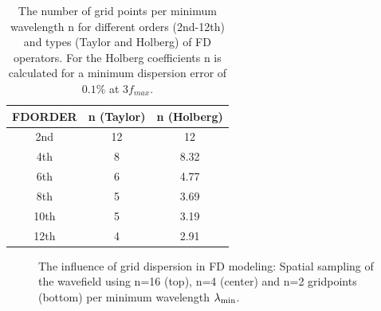 \documentclass[11pt,onecolumn,oneside]{article}
\begin{document}
\begin{table}[hbt]
\begin{center}
\begin{tabular}{ccc}\hline \hline
FDORDER & n (Taylor) & n (Holberg) \\ \hline 
2nd   &   12       &  12         \\
4th   &   8        &  8.32       \\
6th   &   6        &  4.77       \\
8th   &   5        &  3.69       \\ 
10th  &   5        &  3.19       \\
12th  &   4        &  2.91       \\
\hline \hline
\end{tabular}
\caption{\label{grid_disp.2} The number of grid points per minimum wavelength n for different orders (2nd-12th) and types (Taylor and
Holberg) of FD operators. For the Holberg coefficients n is calculated for a minimum dispersion error of $0.1\%$ at $3 f_{max}$.}
\end{center}
\end{table} 
\clearpage
\begin{figure}[ht]
\begin{center}
\caption{\label{grid_disp_pics} The influence of grid dispersion in FD modeling: Spatial sampling of the wavefield using n=16 (top), n=4 (center) and n=2 gridpoints (bottom) per minimum wavelength $\rm{\lambda_{min}}$.}
\end{center}
\end{figure}
\clearpage
\end{document}
